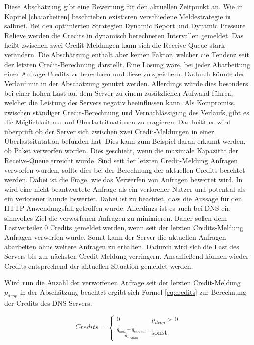 \documentclass[a4paper, 12pt, BCOR10mm, DIV12, toc=bibliography, toc=listof, german]{scrbook}
\begin{document}
		Diese Abschätzung gibt eine Bewertung für den aktuellen Zeitpunkt an. Wie in Kapitel
		\ref{cha:arbeiten} beschrieben existieren verschiedene Meldestrategie in salbnet. Bei den
		optimierten Strategien Dynamic Report und Dynamic Pressure Relieve werden die Credits in
		dynamisch berechneten Intervallen gemeldet. Das heißt zwischen zwei Credit-Meldungen kann sich
		die Receive-Queue stark verändern. Die Abschätzung enthält aber keinen Faktor, welcher die
		Tendenz seit der letzten Credit-Berechnung darstellt. Eine Lösung wäre, bei jeder Abarbeitung
		einer Anfrage Credits zu berechnen und diese zu speichern. Dadurch könnte der Verlauf mit in der
		Abschätzung genutzt werden. Allerdings würde dies besonders bei einer hohen Last auf dem Server
		zu einem zusätzlichen Aufwand führen, welcher die Leistung des Servers negativ beeinflussen
		kann. Als Kompromiss, zwischen ständiger Credit-Berechnung und Vernachlässigung des Verlaufs,
		gibt es die Möglichkeit nur auf Überlastsituationen zu reagieren. Das heißt es wird überprüft ob
		der Server sich zwischen zwei Credit-Meldungen in einer Überlastsitutation befunden hat. Dies
		kann zum Beispiel daran erkannt werden, ob Paket verworfen worden. Dies geschieht, wenn die
		maximale Kapazität der Receive-Queue erreicht wurde. Sind seit der letzten Credit-Meldung
		Anfragen verworfen wurden, sollte dies bei der Berechnung der aktuellen Credits beachtet werden.
		Dabei ist die Frage, wie das Verwerfen von Anfragen bewertet wird. In \cite{scsczile2008} wird
		eine nicht beantwortete Anfrage als ein verlorener Nutzer und potential als ein verlorener Kunde
		bewertet. Dabei ist zu beachtet, dass die Aussage für den HTTP-Anwendungsfall getroffen wurde.
		Allerdings ist es auch bei DNS ein sinnvolles Ziel die verworfenen Anfragen zu minimieren. Daher
		sollen dem Lastverteiler 0 Credits gemeldet werden, wenn seit der letzten Credits-Meldung
		Anfragen verworfen wurde. Somit kann der Server die aktuellen Anfragen abarbeiten ohne weitere
		Anfragen zu erhalten. Dadurch wird sich die Last des Servers bis zur nächsten Credit-Meldung
		verringern. Anschließend können wieder Credits entsprechend der aktuellen Situation gemeldet
		werden.
		
		Wird nun die Anzahl der verworfenen Anfrage seit der letzten Credit-Meldung $p_{drop}$
		in der Abschätzung beachtet ergibt sich Formel \ref{eq:credits} zur Berechnung der Credits des
		DNS-Servers.

		\begin{equation}
			Credits = \begin{cases}0 & p_{drop}>0\\ \frac{\displaystyle q_{max} - q_{current}}{\displaystyle p_{median}}
			  & \text{sonst}\end{cases}
			\label{eq:credits}
		\end{equation}
\end{document}
